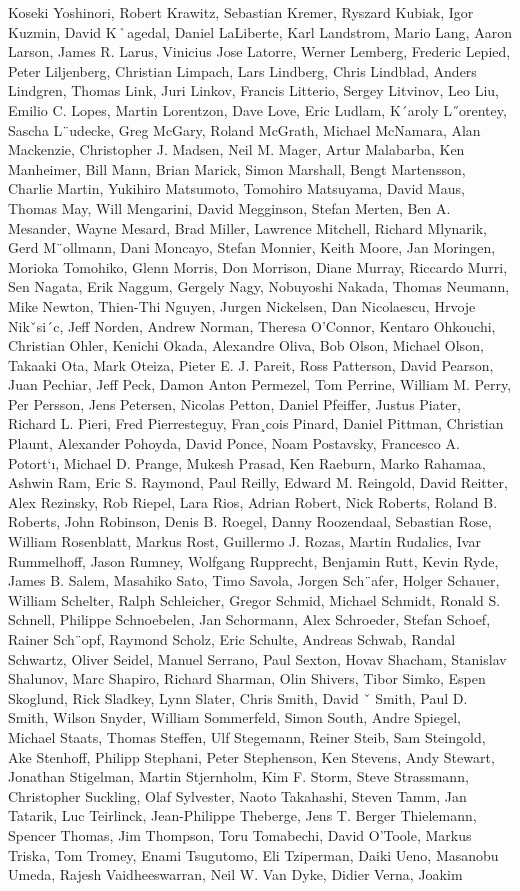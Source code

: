 Koseki Yoshinori, Robert Krawitz, Sebastian Kremer, Ryszard Kubiak, Igor Kuzmin, David K˚agedal, Daniel LaLiberte, Karl Landstrom, Mario Lang, Aaron Larson, James R. Larus, Vinicius Jose Latorre, Werner Lemberg, Frederic Lepied, Peter Liljenberg, Christian Limpach, Lars Lindberg, Chris Lindblad, Anders Lindgren, Thomas Link, Juri Linkov, Francis Litterio, Sergey Litvinov, Leo Liu, Emilio C. Lopes, Martin Lorentzon, Dave Love, Eric Ludlam, K´aroly L˝orentey, Sascha L¨udecke, Greg McGary, Roland McGrath, Michael McNamara, Alan Mackenzie, Christopher J. Madsen, Neil M. Mager, Artur Malabarba, Ken Manheimer, Bill Mann, Brian Marick, Simon Marshall, Bengt Martensson, Charlie Martin, Yukihiro Matsumoto, Tomohiro Matsuyama, David Maus, Thomas May, Will Mengarini, David Megginson, Stefan Merten, Ben A. Mesander, Wayne Mesard, Brad Miller, Lawrence Mitchell, Richard Mlynarik, Gerd M¨ollmann, Dani Moncayo, Stefan Monnier, Keith Moore, Jan Moringen, Morioka Tomohiko, Glenn Morris, Don Morrison, Diane Murray, Riccardo Murri, Sen Nagata, Erik Naggum, Gergely Nagy, Nobuyoshi Nakada, Thomas Neumann, Mike Newton, Thien-Thi Nguyen, Jurgen Nickelsen, Dan Nicolaescu, Hrvoje Nikˇsi´c, Jeff Norden, Andrew Norman, Theresa O’Connor, Kentaro Ohkouchi, Christian Ohler, Kenichi Okada, Alexandre Oliva, Bob Olson, Michael Olson, Takaaki Ota, Mark Oteiza, Pieter E. J. Pareit, Ross Patterson, David Pearson, Juan Pechiar, Jeff Peck, Damon Anton Permezel, Tom Perrine, William M. Perry, Per Persson, Jens Petersen, Nicolas Petton, Daniel Pfeiffer, Justus Piater, Richard L. Pieri, Fred Pierresteguy, Fran¸cois Pinard, Daniel Pittman, Christian Plaunt, Alexander Pohoyda, David Ponce, Noam Postavsky, Francesco A. Potort`ı, Michael D. Prange, Mukesh Prasad, Ken Raeburn, Marko Rahamaa, Ashwin Ram, Eric S. Raymond, Paul Reilly, Edward M. Reingold, David Reitter, Alex Rezinsky, Rob Riepel, Lara Rios, Adrian Robert, Nick Roberts, Roland B. Roberts, John Robinson, Denis B. Roegel, Danny Roozendaal, Sebastian Rose, William Rosenblatt, Markus Rost, Guillermo J. Rozas, Martin Rudalics, Ivar Rummelhoff, Jason Rumney, Wolfgang Rupprecht, Benjamin Rutt, Kevin Ryde, James B. Salem, Masahiko Sato, Timo Savola, Jorgen Sch¨afer, Holger Schauer, William Schelter, Ralph Schleicher, Gregor Schmid, Michael Schmidt, Ronald S. Schnell, Philippe Schnoebelen, Jan Schormann, Alex Schroeder, Stefan Schoef, Rainer Sch¨opf, Raymond Scholz, Eric Schulte, Andreas Schwab, Randal Schwartz, Oliver Seidel, Manuel Serrano, Paul Sexton, Hovav Shacham, Stanislav Shalunov, Marc Shapiro, Richard Sharman, Olin Shivers, Tibor Simko, Espen Skoglund, Rick Sladkey, Lynn Slater, Chris Smith, David ˇ Smith, Paul D. Smith, Wilson Snyder, William Sommerfeld, Simon South, Andre Spiegel, Michael Staats, Thomas Steffen, Ulf Stegemann, Reiner Steib, Sam Steingold, Ake Stenhoff, Philipp Stephani, Peter Stephenson, Ken Stevens, Andy Stewart, Jonathan Stigelman, Martin Stjernholm, Kim F. Storm, Steve Strassmann, Christopher Suckling, Olaf Sylvester, Naoto Takahashi, Steven Tamm, Jan Tatarik, Luc Teirlinck, Jean-Philippe Theberge, Jens T. Berger Thielemann, Spencer Thomas, Jim Thompson, Toru Tomabechi, David O’Toole, Markus Triska, Tom Tromey, Enami Tsugutomo, Eli Tziperman, Daiki Ueno, Masanobu Umeda, Rajesh Vaidheeswarran, Neil W. Van Dyke, Didier Verna, Joakim 